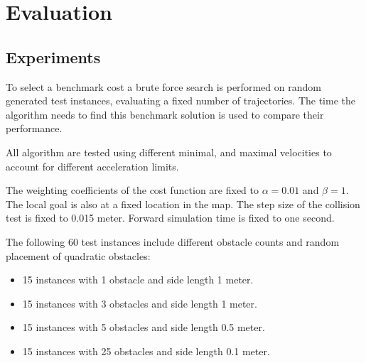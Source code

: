 \chapter{Evaluation}\label{ch:eval}
\section{Experiments}
To select a benchmark cost a brute force search is performed on random generated test instances, evaluating a fixed number of trajectories. 
The time the algorithm needs to find this benchmark solution is used to compare their performance.

All algorithm are tested using different minimal, and maximal velocities to account for different acceleration limits. 

The weighting coefficients of the cost function are fixed to $\alpha=0.01$ and $\beta=1$. The local goal is also at a fixed location in the map. 
The step size of the collision test is fixed to 0.015 meter. 
Forward simulation time is fixed to one second. 

The following 60 test instances include different obstacle counts and random placement of quadratic obstacles:
\begin{itemize}
\item 15 instances with 1 obstacle and side length 1 meter.
\item 15 instances with 3 obstacles and side length 1 meter.
\item 15 instances with 5 obstacles and side length 0.5 meter.
\item 15 instances with 25 obstacles and side length 0.1 meter.
\end{itemize}

